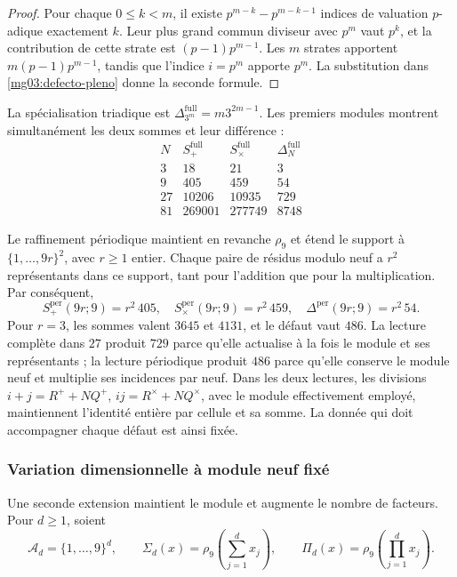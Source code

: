 \begin{proof}
Pour chaque \(0\leq k<m\), il existe
\(p^{m-k}-p^{m-k-1}\) indices de valuation \(p\)-adique
exactement \(k\). Leur plus grand commun diviseur avec \(p^m\) vaut
\(p^k\), et la contribution de cette strate est
\((p-1)p^{m-1}\). Les \(m\) strates apportent
\(m(p-1)p^{m-1}\), tandis que l'indice \(i=p^m\) apporte
\(p^m\). La substitution dans \eqref{mg03:defecto-pleno} donne la
seconde formule.
\end{proof}

La spécialisation triadique est
\(\Delta_{3^m}^{\mathrm{full}}=m3^{2m-1}\). Les premiers modules
montrent simultanément les deux sommes et leur différence :
\[
\begin{array}{c|r|r|r}
 N&S_+^{\mathrm{full}}&S_\times^{\mathrm{full}}&\Delta_N^{\mathrm{full}}\\\hline
 3&18&21&3\\
 9&405&459&54\\
 27&10206&10935&729\\
 81&269001&277749&8748
\end{array}
\]

Le raffinement périodique maintient en revanche \(\rho_9\) et étend
le support à \(\{1,\ldots,9r\}^2\), avec \(r\geq1\) entier. Chaque paire de résidus modulo
neuf a \(r^2\) représentants dans ce support, tant pour
l'addition que pour la multiplication. Par conséquent,
\begin{equation}
 S_+^{\mathrm{per}}(9r;9)=r^2\,405,\quad
 S_\times^{\mathrm{per}}(9r;9)=r^2\,459,\quad
 \Delta^{\mathrm{per}}(9r;9)=r^2\,54.
 \label{mg03:periodico}
\end{equation}
Pour \(r=3\), les sommes valent \(3645\) et \(4131\), et le défaut vaut \(486\). La lecture complète dans \(27\) produit \(729\) parce qu'elle actualise à la fois le module et ses représentants ; la lecture périodique produit \(486\) parce qu'elle conserve le module neuf et multiplie ses incidences par neuf. Dans les deux lectures, les divisions \(i+j=R^++NQ^+\), \(ij=R^\times+NQ^\times\), avec le module effectivement employé, maintiennent l'identité entière par cellule et sa somme. La donnée qui doit accompagner chaque défaut est ainsi fixée.

\subsubsection{Variation dimensionnelle à module neuf fixé}
\label{mg03:dimension}

Une seconde extension maintient le module et augmente le nombre de
facteurs. Pour \(d\geq1\), soient
\[
 \mathcal A_d=\{1,\ldots,9\}^d,\qquad
 \Sigma_d(x)=\rho_9\!\left(\sum_{j=1}^d x_j\right),\qquad
 \Pi_d(x)=\rho_9\!\left(\prod_{j=1}^d x_j\right).
\]

